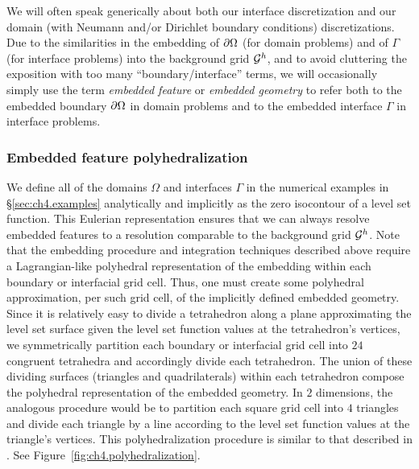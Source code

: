 We will often speak generically about both our interface discretization and our domain (with Neumann and/or Dirichlet boundary conditions) discretizations. Due to the similarities in the embedding of $\partial\Omega$ (for domain problems) and of $\Gamma$ (for interface problems) into the background grid $\mathcal{G}^h$, and to avoid cluttering the exposition with too many ``boundary/interface'' terms, we will occasionally simply use the term \emph{embedded feature} or \emph{embedded geometry} to refer both to the embedded boundary $\partial\Omega$ in domain problems and to the embedded interface $\Gamma$ in interface problems.

\subsubsection{Embedded feature polyhedralization} \label{subsubsec:ch4.polyhedralization}

We define all of the domains $\Omega$ and interfaces $\Gamma$ in the numerical examples in \S\ref{sec:ch4.examples} analytically and implicitly as the zero isocontour of a level set function. This Eulerian representation ensures that we can always resolve embedded features to a resolution comparable to the background grid $\mathcal{G}^h$. Note that the embedding procedure and integration techniques described above require a Lagrangian-like polyhedral representation of the embedding within each boundary or interfacial grid cell. Thus, one must create some polyhedral approximation, per such grid cell, of the implicitly defined embedded geometry. Since it is relatively easy to divide a tetrahedron along a plane approximating the level set surface given the level set function values at the tetrahedron's vertices, we symmetrically partition each boundary or interfacial grid cell into $24$ congruent tetrahedra and accordingly divide each tetrahedron. The union of these dividing surfaces (triangles and quadrilaterals) within each tetrahedron compose the polyhedral representation of the embedded geometry. In $2$ dimensions, the analogous procedure would be to partition each square grid cell into $4$ triangles and divide each triangle by a line according to the level set function values at the triangle's vertices. This polyhedralization procedure is similar to that described in \cite{Min.Chohong07}. See Figure~\ref{fig:ch4.polyhedralization}.

